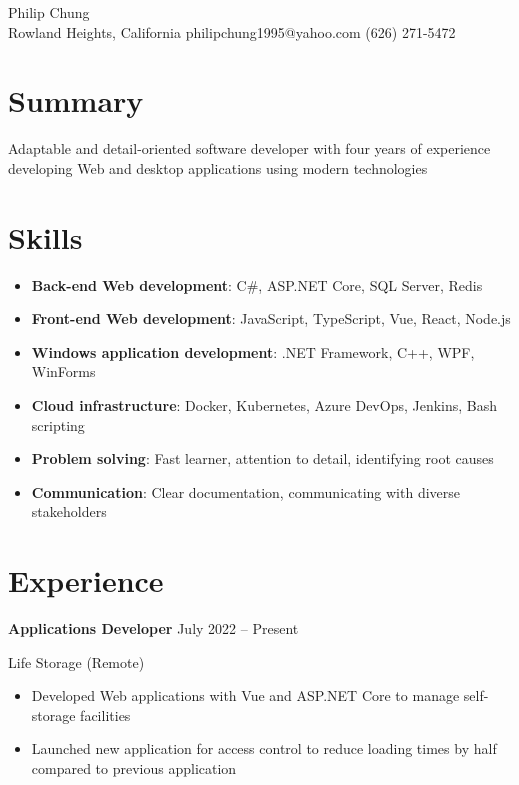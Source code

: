 \documentclass[11pt]{article}
\newcommand{\titleheader}[2]{\textbf{#1} \symbol{"B7} #2}
\newcommand{\locheader}[2]{#1 (#2)}
\begin{document}
	\begin{center}
		{\LARGE Philip Chung} \\ \vspace{0.5em}
		Rowland Heights, California  philipchung1995@yahoo.com  (626) 271-5472
	\end{center}

	\section*{Summary}

	Adaptable and detail-oriented software developer with four years of experience developing Web and desktop applications using modern technologies

	\section*{Skills}

	\newcommand{\skillitem}[2]{\item \textbf{#1}: #2}

	\begin{itemize}
		\skillitem{Back-end Web development}{C\#, ASP.NET Core, SQL Server, Redis}
		\skillitem{Front-end Web development}{JavaScript, TypeScript, Vue, React, Node.js}
		\skillitem{Windows application development}{.NET Framework, C++, WPF, WinForms}
		\skillitem{Cloud infrastructure}{Docker, Kubernetes, Azure DevOps, Jenkins, Bash scripting}
		\skillitem{Problem solving}{Fast learner, attention to detail, identifying root causes}
		\skillitem{Communication}{Clear documentation, communicating with diverse stakeholders}
	\end{itemize}

	\section*{Experience}

	\titleheader{Applications Developer}{July 2022 -- Present}

	\locheader{Life Storage}{Remote}

	\begin{itemize}
		\item Developed Web applications with Vue and ASP.NET Core to manage self-storage facilities
		\item Launched new application for access control to reduce loading times by half compared to previous application
	\end{itemize}
\end{document}
